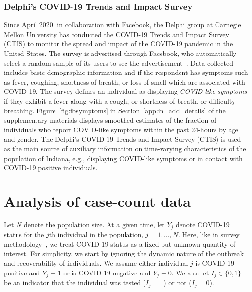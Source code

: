 \documentclass[11pt]{amsart}
\numberwithin{equation}{section}
\theoremstyle{plain}
\begin{document}
 \subsubsection{Delphi's COVID-19 Trends and Impact Survey}
 \label{subsection:fbsymptom}
 Since April 2020, in collaboration with Facebook, the Delphi group at Carnegie Mellon University has conducted the COVID-19 Trends and Impact Survey (CTIS) to monitor the spread and impact of the COVID-19 pandemic in the United States.  The survey is advertised through Facebook, who automatically select a random sample of its users to see the advertisement~\citep{doi:10.1073/pnas.2111454118}.  Data collected includes basic demographic information and if the respondent has symptoms such as fever, coughing, shortness of breath, or loss of smell which are associated with COVID-19.  The survey defines an individual as displaying \emph{COVID-like symptoms} if they exhibit a fever along with a cough, or shortness of breath, or difficulty breathing.  Figure~\ref{fig:fbsymptoms} in Section~\ref{app:in_add_details} of the supplementary materials displays smoothed estimates of the fraction of individuals who report COVID-like symptoms within the past 24-hours by age and gender.  The Delphi's COVID-19 Trends and Impact Survey (CTIS) is used as the main source of auxiliary information on time-varying characteristics of the population of Indiana, e.g., displaying COVID-like symptoms or in contact with COVID-19 positive individuals.



 \section{Analysis of case-count data}
 \label{section:casecount}

 Let $N$ denote the population size.  At a given time, let $Y_j$ denote COVID-19 status for the $j$th individual in the population, $j=1,\ldots, N$. Here, like in survey methodology~\citep{Cochran77}, we treat COVID-19 status as a fixed but unknown quantity of interest. For simplicity, we start by ignoring the dynamic nature of the outbreak and recoverability of individuals. We assume either individual $j$ is COVID-19 positive and $Y_j=1$ or is COVID-19 negative and $Y_j=0$. We also let $I_j \in \{0,1\}$ be an indicator that the individual was tested ($I_j = 1$) or not ($I_j=0$).
\end{document}
